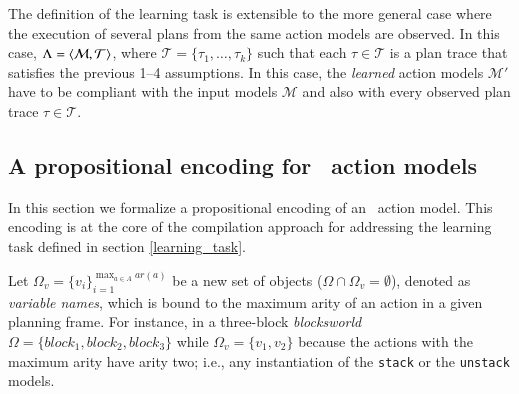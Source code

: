The definition of the learning task is extensible to the more general case where the execution of several plans from the same action models are observed. In this case, $\Lambda={\langle \mathcal{M},\mathcal{T} \rangle}$, where $\mathcal{T}=\{\tau_1,\ldots,\tau_{k}\}$ such that each $\tau\in \mathcal{T}$ is a plan trace that satisfies the previous 1--4 assumptions. In this case, the {\em learned} action models $\mathcal{M}'$ have to be compliant with the input models $\mathcal{M}$ and also with every observed plan trace $\tau\in \mathcal{T}$.


\subsection{A propositional encoding for \strips\ action models}
\label{propositional_encoding}


In this section we formalize a propositional encoding of an \strips\ action model. This encoding is at the core of the \FAMA compilation approach for addressing the learning task defined in section \ref{learning_task}.

Let $\Omega_v=\{v_i\}_{i=1}^{\operatorname*{max}_{a\in A} ar(a)}$ be a new set of objects ($\Omega\cap\Omega_v=\emptyset$), denoted as {\em variable names}, which is bound to the maximum arity of an action in a given planning frame. For instance, in a three-block {\em blocksworld} $\Omega=\{block_1, block_2, block_3\}$ while $\Omega_v=\{v_1,v_2\}$ because the actions with the maximum arity have arity two; i.e., any instantiation of the {\small\tt stack} or the {\small\tt unstack} models.

